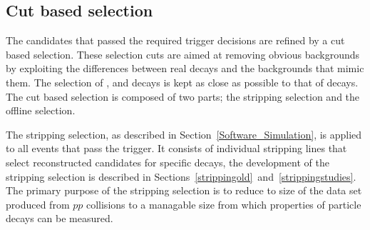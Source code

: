 


\subsection{Cut based selection}
\label{sec:cutbasedsel}
The \bmumu candidates that passed the required trigger decisions are refined by a cut based selection. These selection cuts are aimed at removing obvious backgrounds by exploiting the differences between real \bmumu decays and the backgrounds that mimic them. The selection of \bhh, \bujpsik and \bsjpsiphi decays is kept as close as possible to that of \bmumu decays. The cut based selection is composed of two parts; the stripping selection and the offline selection. 

The stripping selection, as described in Section~\ref{Software_Simulation}, is applied to all events that pass the trigger. It consists of individual stripping lines that select reconstructed candidates for specific decays, the development of the stripping selection is described in Sections~\ref{strippingold}~and~\ref{strippingstudies}.%
The primary purpose of the stripping selection is to reduce to size of the data set produced from $pp$ collisions to a managable size from which properties of particle decays can be measured. 


